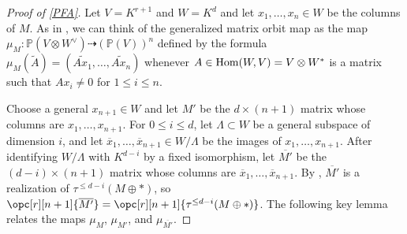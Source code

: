 \documentclass[12pt]{amsart}
\newcommand{\mb}{\mathbb}
\newcommand{\wt}{\widetilde}
\newcommand{\Hom}{{\rm Hom}}
\theoremstyle{plain}
\theoremstyle{definition}
\theoremstyle{remark}
\begin{document}
\begin{proof}[Proof of \cref{PFA}]
Let $V = K^{r+1}$ and $W = K^d$ and let $x_1, \ldots, x_n \in W$ be the columns of $M$. As in , we can think of the generalized matrix orbit map as the map $\mu_{M} : \mb{P}(V \otimes W^\vee) \dashrightarrow (\mb{P}(V))^n$ defined by the formula $\mu_{M}(\wt A) = (\wt{Ax_1}, \ldots, \wt{Ax_n})$ whenever $A \in \Hom(W, V) = V \otimes W^*$ is a matrix such that $A x_i \neq 0$ for $1 \leq i \leq n$.

Choose a general $x_{n+1} \in W$ and let $M'$ be the $d \times (n+1)$ matrix whose columns are $x_1, \ldots, x_{n+1}$. For $0 \leq i \leq d$, let $\Lambda \subset W$ be a general subspace of dimension $i$, and let $\overline{x}_1, \ldots, \overline{x}_{n+1} \in W / \Lambda$ be the images of $x_1, \ldots, x_{n+1}$. After identifying $W/\Lambda$ with $K^{d-i}$ by a fixed isomorphism, let $\overline{M'}$ be the $(d - i)\times (n+1)$ matrix whose columns are $\overline{x}_1, \ldots, \overline{x}_{n+1}$. By , $\overline{M'}$ is a realization of $\tau^{\le d-i}(M \oplus \ast)$, so $\opc[r][n+1]{\overline{M'}} = \opc[r][n+1]{\tau^{\le d-i}(M \oplus \ast)}$. The following key lemma relates the maps $\mu_{M}$, $\mu_{M'}$, and $\mu_{\overline{M'}}$.


\end{proof}
\end{document}
